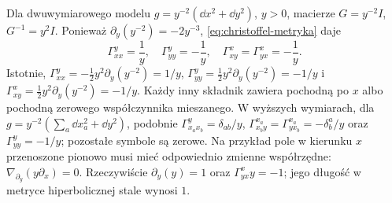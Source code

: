 \begin{przyklad}
\label{prz:christoffel-hiperboliczna}
Dla dwuwymiarowego modelu
$g=y^{-2}(\dd x^2+\dd y^2)$, $y>0$,
macierze $G=y^{-2}I$, $G^{-1}=y^2I$.
Ponieważ $\partial_y(y^{-2})=-2y^{-3}$,
\eqref{eq:christoffel-metryka} daje
\begin{equation}\label{eq:gamma-hiperboliczna}
 \Gamma^y_{xx}=\frac1y,\quad
 \Gamma^y_{yy}=-\frac1y,\quad
 \Gamma^x_{xy}=\Gamma^x_{yx}=-\frac1y.
\end{equation}
Istotnie,
$\Gamma^y_{xx}=-\tfrac12y^2\partial_y(y^{-2})=1/y$,
$\Gamma^y_{yy}=\tfrac12y^2\partial_y(y^{-2})=-1/y$
i $\Gamma^x_{xy}=\tfrac12y^2\partial_y(y^{-2})=-1/y$.
Każdy inny składnik zawiera pochodną po $x$
albo pochodną zerowego współczynnika mieszanego.
W wyższych wymiarach, dla $g=y^{-2}
(\sum_a\dd x_a^2+\dd y^2)$, podobnie
$\Gamma^y_{x_ax_b}=\delta_{ab}/y$,
$\Gamma^{x_a}_{x_by}=\Gamma^{x_a}_{yx_b}=-\delta^a_b/y$
oraz $\Gamma^y_{yy}=-1/y$; pozostałe symbole są zerowe.
Na przykład pole w kierunku $x$ przenoszone
pionowo musi mieć odpowiednio zmienne
współrzędne: $\nabla_{\partial_y}(y\partial_x)=0$.
Rzeczywiście $\partial_y(y)=1$ oraz
$\Gamma^x_{yx}y=-1$; jego długość w metryce
hiperbolicznej stale wynosi $1$.
\end{przyklad}

